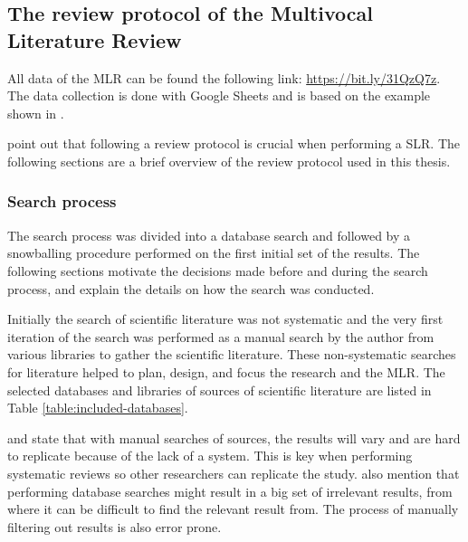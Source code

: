 \documentclass[english, 12pt, a4paper, sci, utf8, a-1b, online]{aaltothesis}
\newcounter{subsubsubsection}[subsubsection]
\begin{document}
\subsection{The review protocol of the Multivocal Literature Review}

\newcommand{\mlrdxlink}{https://bit.ly/31QzQ7z}

All data of the MLR can be found the following link: \href{\mlrdxlink}{https://bit.ly/31QzQ7z}. The data collection is done with Google Sheets and is based on the example shown in \textcite{guidelines-for-MLR}.


\textcite{guidelines-for-SLR-in-SE} point out that following a review protocol is crucial when performing a SLR. The following sections are a brief overview of the review protocol used in this thesis.

\subsubsection{Search process}

The search process was divided into a database search and followed by a snowballing procedure performed on the first initial set of the results. The following sections motivate the decisions made before and during the search process, and explain the details on how the search was conducted.


Initially the search of scientific literature was not systematic and the very first iteration of the search was performed as a manual search by the author from various libraries to gather the scientific literature. These non-systematic searches for literature helped to plan, design, and focus the research and the MLR. The selected databases and libraries of sources of scientific literature are listed in Table \ref{table:included-databases}.

\textcite{guidelines-for-snowballing} and \textcite{guidelines-for-SLR-in-SE} state that with manual searches of sources, the results will vary and are hard to replicate because of the lack of a system. This is key when performing systematic reviews so other researchers can replicate the study. \textcite{guidelines-for-snowballing} also mention that performing database searches might result in a big set of irrelevant results, from where it can be difficult to find the relevant result from. The process of manually filtering out results is also error prone.
\end{document}
